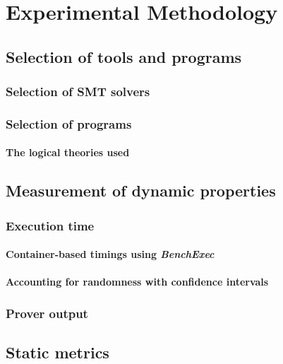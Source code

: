 \chapter{Experimental Methodology}%

\label{Experimental} %


\section{Selection of tools and programs}
\subsection{Selection of \textsc{SMT} solvers}
\subsection{Selection of \why programs}
\subsubsection{The logical theories used}

\section{Measurement of dynamic properties}
\subsection{Execution time}
\subsubsection{Container-based timings using \textit{BenchExec}}
\subsubsection{Accounting for randomness with confidence intervals}
\subsection{Prover output}

\section{Static metrics}
